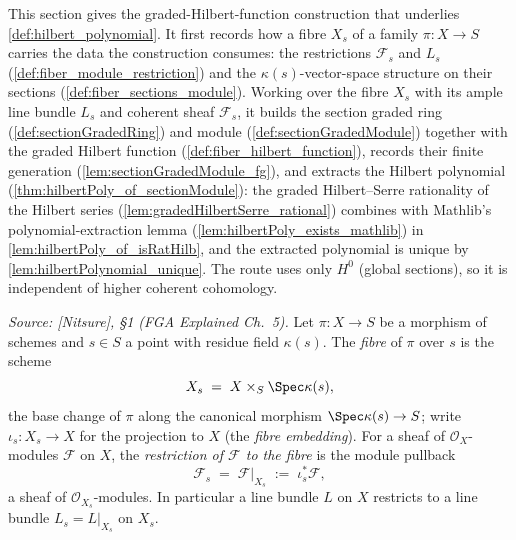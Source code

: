 This section gives the graded-Hilbert-function construction that underlies
\cref{def:hilbert_polynomial}. It first records how a fibre \(X_s\) of a
family \(\pi : X \to S\) carries the data the construction consumes: the
restrictions \(\mathcal{F}_s\) and \(L_s\)
(\cref{def:fiber_module_restriction}) and the \(\kappa(s)\)-vector-space
structure on their sections (\cref{def:fiber_sections_module}). Working over
the fibre \(X_s\) with its ample line bundle \(L_s\) and coherent sheaf
\(\mathcal{F}_s\), it builds the section graded ring
(\cref{def:sectionGradedRing}) and module (\cref{def:sectionGradedModule})
together with the graded Hilbert function
(\cref{def:fiber_hilbert_function}), records their finite generation
(\cref{lem:sectionGradedModule_fg}), and extracts the Hilbert polynomial
(\cref{thm:hilbertPoly_of_sectionModule}): the graded Hilbert--Serre
rationality of the Hilbert series (\cref{lem:gradedHilbertSerre_rational})
combines with Mathlib's polynomial-extraction lemma
(\cref{lem:hilbertPoly_exists_mathlib}) in \cref{lem:hilbertPoly_of_isRatHilb},
and the extracted polynomial is unique by
\cref{lem:hilbertPolynomial_unique}. The route uses only \(H^0\)
(global sections), so it is independent of higher coherent cohomology.

\begin{definition}
  \label{def:fiber_module_restriction}
  \textit{Source: [Nitsure], \S 1 (FGA Explained Ch.~5).}
  Let \(\pi : X \to S\) be a morphism of schemes and \(s \in S\) a point with
  residue field \(\kappa(s)\). The \emph{fibre} of \(\pi\) over \(s\) is the
  scheme
  \[
    X_s \;=\; X \times_S \Spec \kappa(s),
  \]
  the base change of \(\pi\) along the canonical morphism
  \(\Spec \kappa(s) \to S\); write \(\iota_s : X_s \to X\) for the projection
  to \(X\) (the \emph{fibre embedding}). For a sheaf of
  \(\mathcal{O}_X\)-modules \(\mathcal{F}\) on \(X\), the \emph{restriction of
  \(\mathcal{F}\) to the fibre} is the module pullback
  \[
    \mathcal{F}_s \;=\; \mathcal{F}|_{X_s} \;:=\; \iota_s^{*} \mathcal{F},
  \]
  a sheaf of \(\mathcal{O}_{X_s}\)-modules. In particular a line bundle \(L\)
  on \(X\) restricts to a line bundle \(L_s = L|_{X_s}\) on \(X_s\).
\end{definition}

